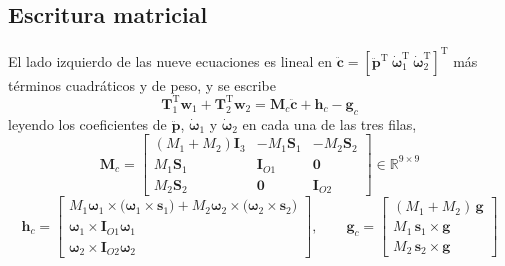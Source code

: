 \documentclass[11pt]{article}
\newcommand{\T}{^{\mathrm{T}}}
\newcommand{\pvec}{\mathbf{p}}
\newcommand{\wv}{\boldsymbol{\omega}}
\newcommand{\cdd}{\ddot{\mathbf{c}}}
\newcommand{\IO}[1]{\mathbf{I}_{O#1}}
\begin{document}
\subsection{Escritura matricial}

El lado izquierdo de las nueve ecuaciones es lineal en $\cdd=[\ddot{\pvec}\T\ \dot{\wv}_1\T\ \dot{\wv}_2\T]\T$ más términos cuadráticos y de peso, y se escribe
\begin{equation}
\boxed{\ \mathbf{T}_1\T\mathbf{w}_1+\mathbf{T}_2\T\mathbf{w}_2=\mathbf{M}_c\cdd+\mathbf{h}_c-\mathbf{g}_c\ }
\label{eq:suma}
\end{equation}
leyendo los coeficientes de $\ddot{\pvec}$, $\dot{\wv}_1$ y $\dot{\wv}_2$ en cada una de las tres filas,
\begin{equation}
\boxed{\ \mathbf{M}_c=
\begin{bmatrix}
(M_1+M_2)\mathbf{I}_3 & -M_1\mathbf{S}_1 & -M_2\mathbf{S}_2\\
M_1\mathbf{S}_1 & \IO{1} & \mathbf{0}\\
M_2\mathbf{S}_2 & \mathbf{0} & \IO{2}
\end{bmatrix}\in\mathbb{R}^{9\times9}\ }
\label{eq:Mc}
\end{equation}
\begin{equation}
\boxed{\ \mathbf{h}_c=
\begin{bmatrix}
M_1\wv_1\times\big(\wv_1\times\mathbf{s}_1\big)+M_2\wv_2\times\big(\wv_2\times\mathbf{s}_2\big)\\[2pt]
\wv_1\times\IO{1}\wv_1\\[2pt]
\wv_2\times\IO{2}\wv_2
\end{bmatrix},
\qquad
\mathbf{g}_c=
\begin{bmatrix}
(M_1+M_2)\,\mathbf{g}\\[2pt]
M_1\,\mathbf{s}_1\times\mathbf{g}\\[2pt]
M_2\,\mathbf{s}_2\times\mathbf{g}
\end{bmatrix}\ }
\label{eq:hcgc}
\end{equation}
\end{document}

